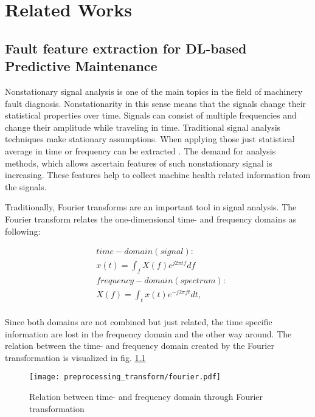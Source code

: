
\chapter{Related Works}\label{chapter:related_works}


\section{Fault feature extraction for DL-based Predictive Maintenance}

Nonstationary signal analysis is one of the main topics in the field of machinery fault diagnosis. Nonstationarity in this sense means that the signals change their statistical properties over time. Signals can consist of multiple frequencies and change their amplitude while traveling in time. Traditional signal analysis techniques make stationary assumptions. When applying those just statistical average in time or frequency can be extracted \cite{FENG2013}. The demand for analysis methods, which allows ascertain features of such nonstationary signal is increasing. These features help to collect machine health related information from the signals.

Traditionally, Fourier transforms are an important tool in signal analysis. The Fourier transform relates the one-dimensional time- and frequency domains as following:

\begin{equation}
    \begin{aligned}
        & time-domain (signal): \\
        & x(t) = \int_{f} X(f) e^{j 2 \pi t f} df \\
        & frequency-domain (spectrum): \\
        & X(f) = \int_{t} x(t) e^{- j 2 \pi f t} dt, \\
    \end{aligned}
\end{equation}

Since both domains are not combined but just related, the time specific information are lost in the frequency domain and the other way around. The relation between the time- and frequency domain created by the Fourier transformation is visualized in fig. \ref{fig:fourier} 
\begin{figure}[p]
  \centering
  \texttt{[image: preprocessing\_transform/fourier.pdf]}
  \caption{Relation between time- and frequency domain through Fourier transformation}
  \label{fig:fourier}
\end{figure}

